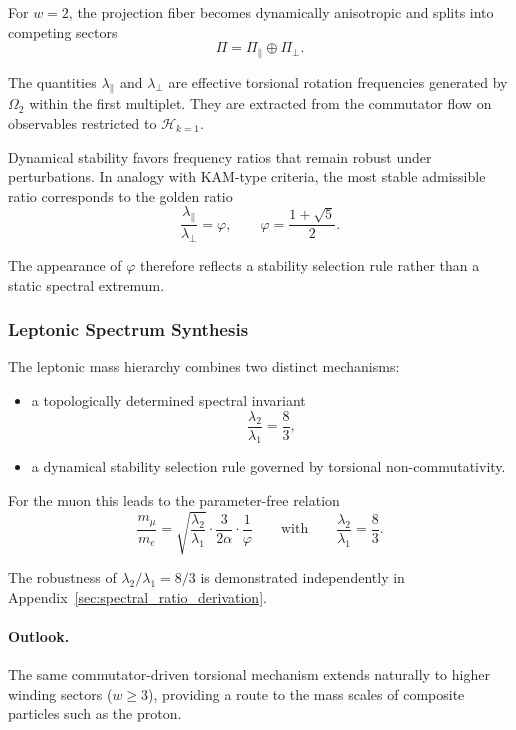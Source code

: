     For $w=2$, the projection fiber becomes dynamically anisotropic
    and splits into competing sectors
    \[
      \Pi=\Pi_{\parallel}\oplus\Pi_{\perp}.
    \]

    The quantities $\lambda_{\parallel}$ and $\lambda_{\perp}$ are
    effective torsional rotation frequencies generated by $\Omega_2$
    within the first multiplet.
    They are extracted from the commutator flow on observables
    restricted to $\mathcal{H}_{k=1}$.

    Dynamical stability favors frequency ratios that remain robust
    under perturbations.
    In analogy with KAM-type criteria, the most stable admissible
    ratio corresponds to the golden ratio
    \begin{equation}
      \frac{\lambda_{\parallel}}{\lambda_{\perp}}
      = \varphi ,
      \qquad
      \varphi=\frac{1+\sqrt5}{2}.
      \label{eq:beta-golden}
    \end{equation}

    The appearance of $\varphi$ therefore reflects a stability
    selection rule rather than a static spectral extremum.

  \subsubsection*{Leptonic Spectrum Synthesis}
    \label{sec:leptonic-synthesis}

    The leptonic mass hierarchy combines two distinct mechanisms:

    \begin{itemize}
      \item a topologically determined spectral invariant
      \[
        \frac{\lambda_2}{\lambda_1}=\frac{8}{3},
      \]

      \item a dynamical stability selection rule governed by
      torsional non-commutativity.
    \end{itemize}

    For the muon this leads to the parameter-free relation
    \begin{equation}
      \boxed{
        \frac{m_\mu}{m_e}
        = \sqrt{\frac{\lambda_{2}}{\lambda_{1}}}
        \cdot \frac{3}{2\alpha}
        \cdot \frac{1}{\varphi}
      }
      \qquad\text{with}\qquad
      \frac{\lambda_2}{\lambda_1}=\frac{8}{3}.
      \label{eq:muon-ratio-final}
    \end{equation}

    The robustness of $\lambda_2/\lambda_1=8/3$ is demonstrated
    independently in Appendix~\ref{sec:spectral_ratio_derivation}.

    \paragraph*{Outlook.}
      The same commutator-driven torsional mechanism extends naturally
      to higher winding sectors ($w\ge 3$), providing a route to the
      mass scales of composite particles such as the proton.
